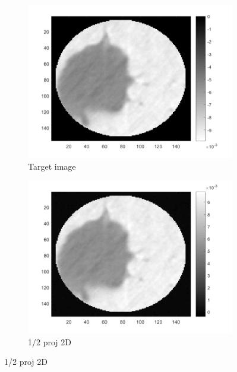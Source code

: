 \begin{figure}[ht!]
       		\centering
      		\begin{subfigure}[b]{0.24\textwidth}
            	\centering
            	\includegraphics[width=\textwidth]{../../data/res/target1.png}
            	\caption{Target image}    
        	\end{subfigure}
        	\begin{subfigure}[b]{0.24\textwidth}  
            	\centering 
            	\includegraphics[width=\textwidth]{../../data/res/SB_Reconstruction/2D/Target1/1_2.png}
            	\caption{1/2 proj 2D}    
            	\label{subfig:156p1L-D}
        	\end{subfigure}

\end{figure}
